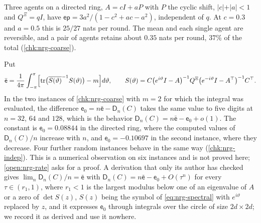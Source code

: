 \begin{example}\label{ex:nrg-ring}
Three agents on a directed ring, $A=cI+aP$ with $P$ the cyclic shift, $\vert c\vert+\vert a\vert<1$ and $Q^{\Xi}=qI$, have $\mathsf{ep}=3a^2/(1-c^2+ac-a^2)$, independent of $q$. At $c=0.3$ and $a=0.5$ this is $25/27$ nats per round. The mean and each single agent are reversible, and a pair of agents retains about $0.35$ nats per round, $37\%$ of the total (\cref{chk:nrg-coarse}).
\end{example}

\begin{observation}\label{obs:nrg-spectral}
Put
\begin{equation}\label{eq:nrg-spectral}
\bar{\mathsf e}=\frac1{4\pi}\int_{-\pi}^{\pi}\Bigl[\operatorname{tr}\bigl(\overline{S(\vartheta)}^{-1}S(\vartheta)\bigr)-m\Bigr]d\vartheta,\qquad S(\vartheta)=C\bigl(e^{i\vartheta}I-A\bigr)^{-1}Q^{\Xi}\bigl(e^{-i\vartheta}I-A^\top\bigr)^{-1}C^\top.
\end{equation}
In the two instances of \cref{chk:nrg-coarse} with $m=2$ for which the integral was evaluated, the difference $\mathsf e_0=n\bar{\mathsf e}-\mathsf D_n(C)$ takes the same value to five digits at $n=32$, $64$ and $128$, which is the behavior $\mathsf D_n(C)=n\bar{\mathsf e}-\mathsf e_0+o(1)$. The constant is $\mathsf e_0=0.08844$ in the directed ring, where the computed values of $\mathsf D_n(C)/n$ increase with $n$, and $\mathsf e_0=-0.10697$ in the second instance, where they decrease. Four further random instances behave in the same way (\cref{chk:nrg-indep}). This is a numerical observation on six instances and is not proved here; \cref{open:nrg-rate} asks for a proof. A derivation that only its author has checked gives $\lim_n\mathsf D_n(C)/n=\bar{\mathsf e}$ with $\mathsf D_n(C)=n\bar{\mathsf e}-\mathsf e_0+O(\tau^n)$ for every $\tau\in(r_1,1)$, where $r_1<1$ is the largest modulus below one of an eigenvalue of $A$ or a zero of $\det S(z)$, $S(z)$ being the symbol of \cref{eq:nrg-spectral} with $e^{i\vartheta}$ replaced by $z$, and it expresses $\mathsf e_0$ through integrals over the circle of size $2d\times2d$; we record it as derived and use it nowhere.
\end{observation}

